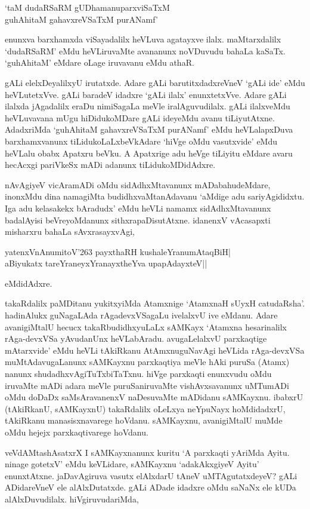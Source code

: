 \begin{shloka}
`taM dudaRSaRM gUDhamanuparxviSaTxM\\
guhAhitaM gahavxreVSaTxM purANamf'
\end{shloka}

enunxva barxhamxda viSayadalilx heVLuva agatayxve ilalx. maMtarxdalilx `dudaRSaRM' eMdu heVLiruvaMte avananunx noVDuvudu bahaLa kaSaTx. `guhAhitaM' eMdare oLage iruvavanu eMdu athaR.

gALi elelxDeyalilxyU irutatxde. Adare gALi barutitxdadxreVneV `gALi ide' eMdu heVLutetxVve. gALi baradeV idadxre `gALi ilalx' enunxtetxVve. Adare gALi ilalxda jAgadalilx eraDu nimiSagaLa meVle iralAguvudilalx. gALi ilalxveMdu heVLuvavana mUgu hiDidukoMDare gALi ideyeMdu avanu tiLiyutAtxne. AdadxriMda `guhAhitaM gahavxreVSaTxM purANamf' eMdu heVLalapxDuva barxhamxvanunx tiLidukoLaLxbeVkAdare `hiVge oMdu vasutxvide' eMdu heVLalu obabx Apatxru beVku. A Apatxrige adu heVge tiLiyitu eMdare avaru hecAcxgi pariVkeSx mADi adanunx tiLidukoMDidAdxre.

nAvAgiyeV vicAramADi oMdu sidAdhxMtavanunx mADabahudeMdare, inonxMdu dina namagiMta budidhxvaMtanAdavanu `aMdige adu sariyAgididxtu. Iga adu kelasakekx bAradudx' eMdu heVLi namamx sidAdhxMtavanunx badalAyisi beVreyoMdanunx sithxrapaDisutAtxne. idanenxV vAcasapxti misharxru bahaLa sAvxrasayxvAgi,

\begin{shloka}
yatenxVnAnumitoV\char'263 payxthaRH kushaleYranumAtaqBiH|\\
aBiyukatx tareYraneyxYranayxtheYva upapAdayxteV||
\end{shloka}

eMdidAdxre.

takaRdalilx paMDitanu yukitxyiMda Atamxnige `AtamxnaH sUyxH catudaRsha'. hadinAlukx guNagaLAda rAgadevxVSagaLu ivelalxvU ive eMdanu. Adare avanigiMtalU hecucx takaRbudidhxyuLaLx sAMKayx `Atamxna hesarinalilx rAga-devxVSa yAvudanUnx heVLabAradu. avugaLelalxvU parxkaqtige mAtarxvide' eMdu heVLi tAkiRkanu AtAmxnuguNavAgi heVLida rAga-devxVSa muMtAdavugaLanunx sAMKayxnu parxkaqtiya meVle hAki puruSa (Atamx) nanunx shudadhxvAgiTuTxbiTaTxnu. hiVge parxkaqti enunxvudu oMdu iruvaMte mADi adara meVle puruSaniruvaMte vishAvxsavanunx uMTumADi oMdu doDaDx saMsAravanenxV naDesuvaMte mADidanu sAMKayxnu. ibabxrU (tAkiRkanU, sAMKayxnU) takaRdalilx oLeLxya neYpuNayx hoMdidadxrU, tAkiRkanu manasisxnavarege hoVdanu. sAMKayxnu, avanigiMtalU muMde oMdu hejejx parxkaqtivarege hoVdanu.

veVdAMtashAsatxrX I sAMKayxnanunx kuritu `A parxkaqti yAriMda Ayitu. ninage gotetxV' eMdu keVLidare, sAMKayxnu `adakAkxgiyeV Ayitu' enunxtAtxne. jaDavAgiruva vasutx elAlxdarU tAneV uMTAgutatxdeyeV? gALi ADidareVneV ele alAlxDutatxde. gALi ADade idadxre oMdu saNaNx ele kUDa alAlxDuvudilalx. hiVgiruvudariMda,

